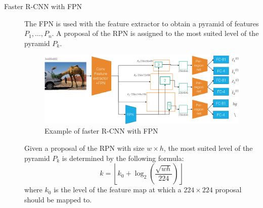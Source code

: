 \begin{description}
    \item[Faster R-CNN with FPN] 
        The FPN is used with the feature extractor to obtain a pyramid of features $P_1, \dots, P_n$. A proposal of the RPN is assigned to the most suited level of the pyramid $P_k$.

        \begin{figure}[H]
            \centering
            \includegraphics[width=0.8\linewidth]{./img/_faster_r_cnn_fpn.pdf}
            \caption{Example of faster R-CNN with FPN}
        \end{figure}

        \begin{remark}
            Given a proposal of the RPN with size $w \times h$, the most suited level of the pyramid $P_k$ is determined by the following formula:
            \[ k = \left\lfloor k_0 + \log_2\left(\frac{\sqrt{wh}}{224}\right) \right\rfloor \]
            where $k_0$ is the level of the feature map at which a $224 \times 224$ proposal should be mapped to.
        \end{remark}
\end{description}